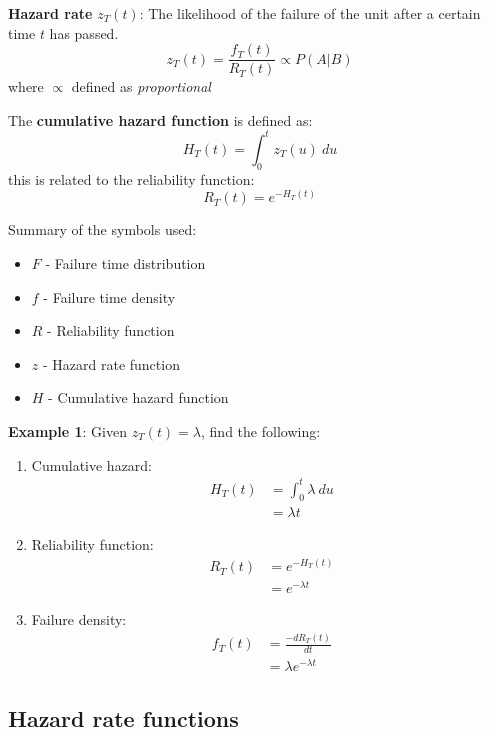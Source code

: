 \documentclass[10pt,a4paper]{article}
\begin{document}
\begin{tcolorbox}[breakable,colback=white]
    \textbf{Hazard rate} $z_T(t)$: The likelihood of the failure of the unit after a certain time $t$ has passed.
    $$
        z_T(t) = \frac{f_T(t)}{R_T(t)} \propto P(A|B)
    $$
    where $\propto$ defined as \textit{proportional}
\end{tcolorbox}

The \textbf{cumulative hazard function} is defined as:
$$
    H_T(t) = \int_0^t z_T(u)\: du 
$$
this is related to the reliability function:
$$
    R_T(t) = e^{-H_T(t)}
$$


Summary of the symbols used:
\begin{itemize}
    \item $F$ - Failure time distribution
    \item $f$ - Failure time density 
    \item $R$ - Reliability function
    \item $z$ - Hazard rate function 
    \item $H$ - Cumulative hazard function
\end{itemize}


\textbf{Example 1}: Given $z_T(t) = \lambda$, find the following:
\begin{enumerate}
    \item Cumulative hazard:
    \begin{align*}
        H_T(t) &= \int_0^t \lambda \: du \\
        &= \lambda t
    \end{align*}
    \item Reliability function:
    \begin{align*}
        R_T(t) &= e^{-H_T(t)} \\
        &= e^{-\lambda t} 
    \end{align*}
    \item Failure density:
    \begin{align*}
        f_T(t) &= \frac{-dR_T(t)}{dt} \\
        &= \lambda e^{-\lambda t}
    \end{align*}
\end{enumerate}

\pagebreak

\subsection{Hazard rate functions}
\end{document}
